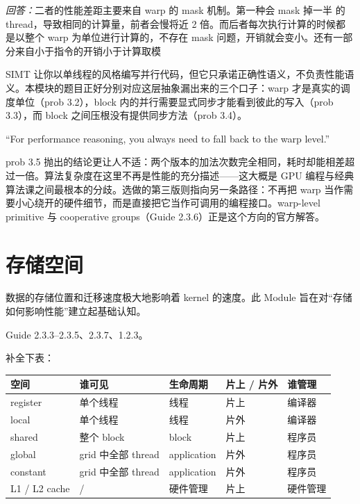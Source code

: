 \documentclass[11pt,a4paper,fontset=none]{ctexart}
\begin{document}
\par\noindent\textit{回答：}二者的性能差距主要来自 warp 的 mask 机制。第一种会 mask 掉一半 的 thread，导致相同的计算量，前者会慢将近 2 倍。而后者每次执行计算的时候都是以整个 warp 为单位进行计算的，不存在 mask 问题，开销就会变小。还有一部分来自小于指令的开销小于计算取模\\


\begin{lookback}
SIMT 让你以单线程的风格编写并行代码，但它只承诺正确性语义，不负责性能语义。本模块的题目正好分别对应这层抽象漏出来的三个口子：warp 才是真实的调度单位（prob 3.2），block 内的并行需要显式同步才能看到彼此的写入（prob 3.3），而 block 之间压根没有提供同步方法（prob 3.4）。

``For performance reasoning, you always need to fall back to the warp level.''

prob 3.5 抛出的结论更让人不适：两个版本的加法次数完全相同，耗时却能相差超过一倍。算法复杂度在这里不再是性能的充分描述——这大概是 GPU 编程与经典算法课之间最根本的分歧。选做的第三版则指向另一条路径：不再把 warp 当作需要小心绕开的硬件细节，而是直接把它当作可调用的编程接口。warp-level primitive 与 cooperative groups（Guide 2.3.6）正是这个方向的官方解答。
\end{lookback}

\section{存储空间}

数据的存储位置和迁移速度极大地影响着 kernel 的速度。此 Module 旨在对“存储如何影响性能”建立起基础认知。

\begin{reading}
Guide 2.3.3--2.3.5、2.3.7、1.2.3。
\end{reading}

补全下表：

\begin{center}\small
\begin{tabular}{@{}lp{8em}p{7em}p{6em}p{8em}@{}}
\toprule
空间 & 谁可见 & 生命周期 & 片上 / 片外 & 谁管理 \\
\midrule
register & 单个线程 & 线程 & 片上 & 编译器 \\
local & 单个线程 & 线程 & 片外 & 编译器 \\
shared & 整个 block & block & 片上 & 程序员 \\
global & grid 中全部 thread & application & 片外 & 程序员 \\
constant & grid 中全部 thread & application & 片外 & 程序员 \\
L1 / L2 cache & / & 硬件管理 & 片上 & 硬件管理 \\
\bottomrule
\end{tabular}
\end{center}
\end{document}
